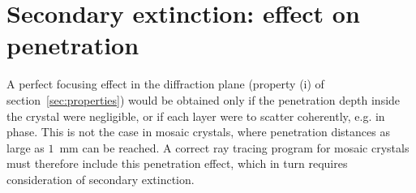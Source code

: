 \documentclass{iucr}
\begin{document}


\section{Secondary extinction: effect on penetration}
\label{sec:penetration}

A perfect focusing effect in the diffraction plane (property (i) of
section~\ref{sec:properties}) would be obtained only if the penetration depth
inside the crystal were negligible, or if each layer were to scatter coherently,
e.g. in phase. This is not the case in mosaic crystals, where penetration distances
as large as $1$~mm can be reached. A correct ray tracing program for mosaic
crystals must therefore include this penetration effect, which in turn requires
consideration of secondary extinction.
\end{document}
